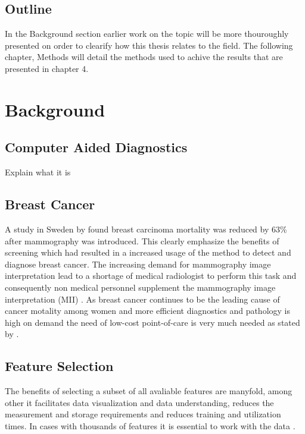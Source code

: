\documentclass{kththesis}
\begin{document}
\section{Outline}

In the Background section earlier work on the topic will be more thouroughly presented on order to clearify how this thesis relates to the field. The following chapter, Methods will detail the methods used to achive the results that are presented in chapter 4.

\chapter{Background}

\section{Computer Aided Diagnostics}

Explain what it is

\section{Breast Cancer}

A study in Sweden by \textcite{tabar2001} found breast carcinoma mortality was reduced by 63\% after mammography was introduced. This clearly emphasize the benefits of screening which had resulted in a increased usage of the method to detect and diagnose breast cancer. The increasing demand for mammography image interpretation lead to a shortage of medical radiologist to perform this task and consequently non medical personnel supplement the mammography image interpretation (MII) \parencite{culpan2016}. As breast cancer continues to be the leading cause of cancer motality among women and more efficient diagnostics and pathology is high on demand the need of low-cost point-of-care is very much needed as stated by \textcite{martei2018}.

\section{Feature Selection}

The benefits of selecting a subset of all avaliable features are manyfold, among other it facilitates data visualization and data understanding, reduces the measurement and storage requirements and reduces training and utilization times. In cases with thousands of features it is essential to work with the data \parencite{guyon2003}.
\end{document}
